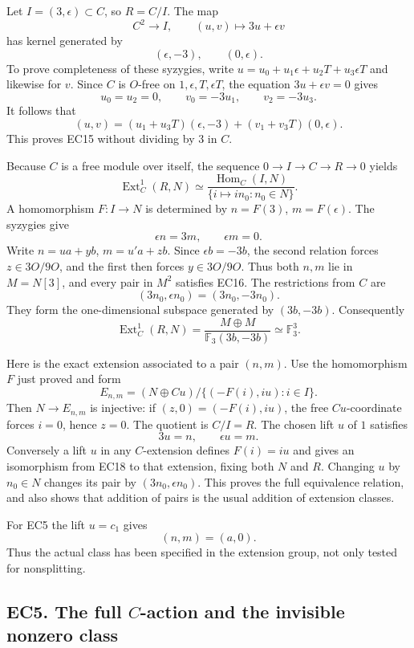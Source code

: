 \documentclass[
  10pt,
  a4paper,
]{article}
\begin{document}
Let \(I=(3,\epsilon)\subset C\), so \(R=C/I\). The map \[
C^2\longrightarrow I,\qquad (u,v)\longmapsto3u+\epsilon v
\] has kernel generated by \[
(\epsilon,-3),\qquad(0,\epsilon).
\tag{EC15}
\] To prove completeness of these syzygies, write
\(u=u_0+u_1\epsilon+u_2T+u_3\epsilon T\) and likewise for \(v\). Since
\(C\) is \(O\)-free on \(1,\epsilon,T,\epsilon T\), the equation
\(3u+\epsilon v=0\) gives \[
u_0=u_2=0,\qquad v_0=-3u_1,\qquad v_2=-3u_3.
\] It follows that \[
(u,v)=(u_1+u_3T)(\epsilon,-3)+(v_1+v_3T)(0,\epsilon).
\] This proves EC15 without dividing by 3 in \(C\).

Because \(C\) is a free module over itself, the sequence
\(0\to I\to C\to R\to0\) yields \[
\operatorname{Ext}^1_C(R,N)
\simeq
\frac{\operatorname{Hom}_C(I,N)}
{\{i\mapsto in_0:n_0\in N\}}.
\] A homomorphism \(F:I\to N\) is determined by \(n=F(3)\),
\(m=F(\epsilon)\). The syzygies give \[
\epsilon n=3m,\qquad\epsilon m=0.
\tag{EC16}
\] Write \(n=u a+y b\), \(m=u'a+z b\). Since \(\epsilon b=-3b\), the
second relation forces \(z\in3O/9O\), and the first then forces
\(y\in3O/9O\). Thus both \(n,m\) lie in \(M=N[3]\), and every pair in
\(M^2\) satisfies EC16. The restrictions from \(C\) are \[
(3n_0,\epsilon n_0)=(3n_0,-3n_0).
\] They form the one-dimensional subspace generated by \((3b,-3b)\).
Consequently \[
\boxed{\operatorname{Ext}^1_C(R,N)
=\frac{M\oplus M}{\mathbb F_3(3b,-3b)}
\simeq\mathbb F_3^3.}
\tag{EC17}
\]

Here is the exact extension associated to a pair \((n,m)\). Use the
homomorphism \(F\) just proved and form \[
E_{n,m}=(N\oplus C u)/\{(-F(i),iu):i\in I\}.
\tag{EC18}
\] Then \(N\to E_{n,m}\) is injective: if \((z,0)=(-F(i),iu)\), the free
\(C u\)-coordinate forces \(i=0\), hence \(z=0\). The quotient is
\(C/I=R\). The chosen lift \(u\) of \(1\) satisfies \[
3u=n,\qquad\epsilon u=m.
\tag{EC19}
\] Conversely a lift \(u\) in any \(C\)-extension defines \(F(i)=iu\)
and gives an isomorphism from EC18 to that extension, fixing both \(N\)
and \(R\). Changing \(u\) by \(n_0\in N\) changes its pair by
\((3n_0,\epsilon n_0)\). This proves the full equivalence relation, and
also shows that addition of pairs is the usual addition of extension
classes.

For EC5 the lift \(u=c_1\) gives \[
(n,m)=(a,0).
\tag{EC20}
\] Thus the actual class has been specified in the extension group, not
only tested for nonsplitting.

\subsection{\texorpdfstring{EC5. The full \(C\)-action and the invisible
nonzero
class}{EC5. The full C-action and the invisible nonzero class}}\label{ec5.-the-full-c-action-and-the-invisible-nonzero-class}
\end{document}
